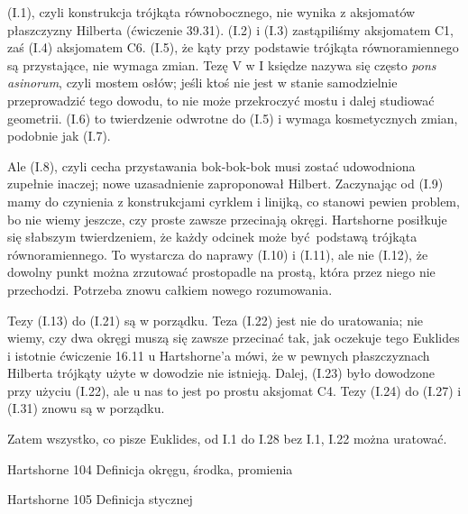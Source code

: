 {(I.1), czyli konstrukcja trójkąta równobocznego, nie wynika z aksjomatów płaszczyzny Hilberta (ćwiczenie 39.31).
(I.2) i (I.3) zastąpiliśmy aksjomatem C1, zaś (I.4) aksjomatem C6.
(I.5), że kąty przy podstawie trójkąta równoramiennego są przystające, nie wymaga zmian.
Tezę V w I księdze nazywa się często \emph{pons asinorum}, czyli mostem osłów; jeśli ktoś nie jest w stanie samodzielnie przeprowadzić tego dowodu, to nie może przekroczyć mostu i dalej studiować geometrii.
%
%
(I.6) to twierdzenie odwrotne do (I.5) i wymaga kosmetycznych zmian, podobnie jak (I.7).

Ale (I.8), czyli cecha przystawania bok-bok-bok musi zostać udowodniona zupełnie inaczej; nowe uzasadnienie zaproponował Hilbert.
Zaczynając od (I.9) mamy do czynienia z konstrukcjami cyrklem i linijką, co stanowi pewien problem, bo nie wiemy jeszcze, czy proste zawsze przecinają okręgi.
Hartshorne posiłkuje się słabszym twierdzeniem, że każdy odcinek może być podstawą trójkąta równoramiennego.
To wystarcza do naprawy (I.10) i (I.11), ale nie (I.12), że dowolny punkt można zrzutować prostopadle na prostą, która przez niego nie przechodzi.
Potrzeba znowu całkiem nowego rozumowania.

Tezy (I.13) do (I.21) są w porządku.
Teza (I.22) jest nie do uratowania; nie wiemy, czy dwa okręgi muszą się zawsze przecinać tak, jak oczekuje tego Euklides i istotnie ćwiczenie 16.11 u Hartshorne'a mówi, że w pewnych płaszczyznach Hilberta trójkąty użyte w dowodzie nie istnieją.
Dalej, (I.23) było dowodzone przy użyciu (I.22), ale u nas to jest po prostu aksjomat C4.
Tezy (I.24) do (I.27) i (I.31) znowu są w porządku.

Zatem wszystko, co pisze Euklides, od I.1 do I.28 bez I.1, I.22 można uratować.

Hartshorne 104
Definicja okręgu, środka, promienia

Hartshorne 105
Definicja stycznej


}
